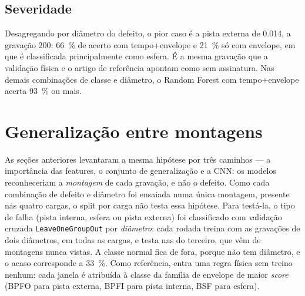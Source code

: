 \subsection{Severidade}
\label{sec:res-severidade}

Desagregando por diâmetro do defeito, o pior caso é a
pista externa de \SI{0.014}{\inch}, a gravação 200: \SI{66}{\percent} de acerto
com tempo+envelope e \SI{21}{\percent} só com envelope, em que é classificada
principalmente como esfera. É a mesma gravação que a validação física e o artigo
de referência apontam como sem assinatura. Nas demais combinações de classe e
diâmetro, o Random Forest com tempo+envelope acerta \SI{93}{\percent} ou mais.

\section{Generalização entre montagens}
\label{sec:res-montagem}

As seções anteriores levantaram a mesma hipótese por três caminhos --- a
importância das features, o conjunto de generalização e a CNN: os modelos
reconheceriam a \emph{montagem} de cada gravação, e não o defeito. Como cada
combinação de defeito e diâmetro foi ensaiada numa única montagem, presente nas
quatro cargas, o split por carga não testa essa hipótese. Para testá-la, o tipo de
falha (pista interna, esfera ou pista externa) foi classificado com validação
cruzada \texttt{LeaveOneGroupOut} por \emph{diâmetro}: cada rodada treina com as
gravações de dois diâmetros, em todas as cargas, e testa nas do terceiro, que
vêm de montagens nunca vistas. A classe normal fica de fora, porque não tem
diâmetro, e o acaso corresponde a \SI{33}{\percent}. Como referência, entra uma
regra física sem treino nenhum: cada janela é atribuída à classe da família de
envelope de maior \emph{score} (BPFO para pista externa, BPFI para pista interna, BSF
para esfera).

